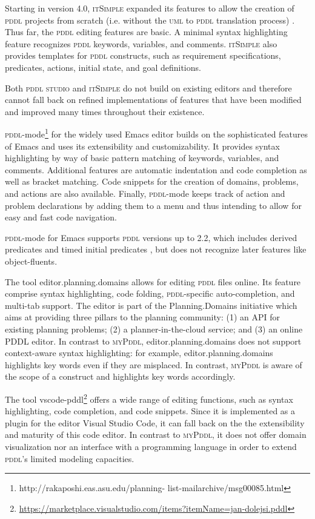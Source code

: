 \documentclass[runningheads]{llncs}
\newcommand{\mypddl}{\textsc{myPddl}\xspace}
\newcommand{\pddlstudio}{\textsc{pddl studio}\xspace}
\newcommand{\itsimple}{\textsc{itSimple}\xspace}
\newcommand{\pddlmode}{\textsc{pddl}-mode\xspace}
\newcommand{\pddl}{\textsc{pddl}\xspace}
\newcommand{\uml}{\textsc{uml}\xspace}
\begin{document}
Starting in version 4.0, \itsimple expanded its features to allow the
creation of \pddl projects from scratch (i.e. without the \uml to
\pddl translation process) \cite{vaquero2012itsimple4}. Thus far, the
\pddl editing features are basic. A minimal syntax highlighting
feature recognizes \pddl keywords, variables, and comments. \itsimple
also provides templates for \pddl constructs, such as requirement
specifications, predicates, actions, initial state, and goal
definitions.

Both \pddlstudio and \itsimple do not build on existing editors and
therefore cannot fall back on refined implementations of features that
have been modified and improved many times throughout their existence.

\pddlmode\footnote{http://rakaposhi.eas.asu.edu/planning-
  list-mailarchive/msg00085.html } for the widely used Emacs editor
builds on the sophisticated features of Emacs and uses its
extensibility and customizability. It provides syntax highlighting by
way of basic pattern matching of keywords, variables, and
comments. Additional features are automatic indentation and code
completion as well as bracket matching. Code snippets for the creation
of domains, problems, and actions are also available. Finally,
\textsc{pddl}-mode keeps track of action and problem declarations by
adding them to a menu and thus intending to allow for easy and fast
code navigation.

\pddlmode for Emacs supports \textsc{pddl} versions up to
2.2, which includes derived predicates and timed initial predicates
\cite{edelkamp2004pddl2}, but does not recognize later features like
object-fluents.

The tool editor.planning.domains allows for editing \textsc{pddl}
files online. Its feature comprise syntax highlighting, code folding,
\textsc{pddl}-specific auto-completion, and multi-tab support. The
editor is part of the Planning.Domains initiative which aims at
providing three pillars to the planning community: (1) an API for
existing planning problems; (2) a planner-in-the-cloud service; and
(3) an online PDDL editor. In contrast to \mypddl,
editor.planning.domains does not support context-aware syntax
highlighting: for example, editor.planning.domains highlights key
words even if they are misplaced. In contrast, \mypddl is aware of the
scope of a construct and highlights key words accordingly.

The tool
vscode-pddl\footnote{\url{https://marketplace.visualstudio.com/items?itemName=jan-dolejsi.pddl}}
offers a wide range of editing functions, such as syntax highlighting,
code completion, and code snippets. Since it is implemented as a
plugin for the editor Visual Studio Code, it can fall back on the the
extensibility and maturity of this code editor. In contrast to
\mypddl, it does not offer domain visualization nor an interface with
a programming language in order to extend \pddl's limited modeling
capacities.
\end{document}
